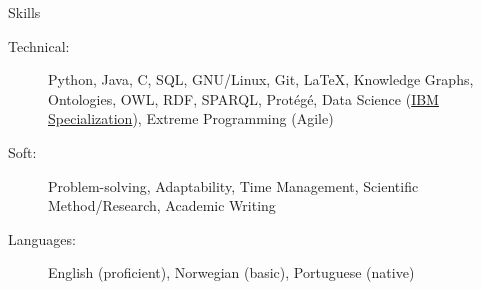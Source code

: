 %
\begin{rSection}{Skills}
    \begin{description}
        \item[Technical:] Python, Java, C, SQL, GNU/Linux, Git, \LaTeX, Knowledge Graphs, Ontologies, OWL, RDF, SPARQL, Protégé, Data Science (\href{https://www.coursera.org/account/accomplishments/specialization/certificate/V45HAAHQS4AE}{IBM Specialization}), Extreme Programming (Agile)
        \item[Soft:] Problem-solving, Adaptability, Time Management, Scientific Method/Research, Academic Writing
        \item[Languages:] English (proficient), Norwegian (basic), Portuguese (native)
    \end{description}
    
\end{rSection}
